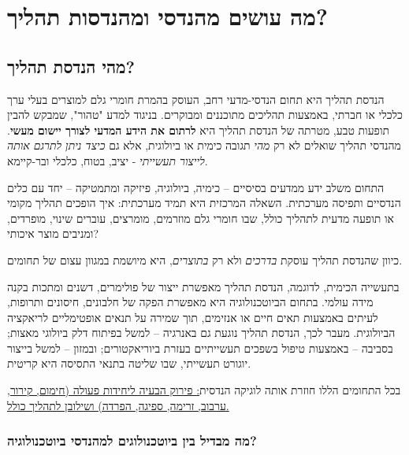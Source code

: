 \documentclass[
  hebrew,
  letterpaper,
  DIV=11,
  numbers=noendperiod]{scrreprt}
\begin{document}

\chapter{\texorpdfstring{{מה עושים מהנדסי ומהנדסות
תהליך?}}{מה עושים מהנדסי ומהנדסות תהליך?}}\label{ux5deux5d4-ux5e2ux5d5ux5e9ux5d9ux5dd-ux5deux5d4ux5e0ux5d3ux5e1ux5d9-ux5d5ux5deux5d4ux5e0ux5d3ux5e1ux5d5ux5ea-ux5eaux5d4ux5dcux5d9ux5da}

\section{\texorpdfstring{{מהי הנדסת
תהליך}?}{מהי הנדסת תהליך?}}\label{ux5deux5d4ux5d9-ux5d4ux5e0ux5d3ux5e1ux5ea-ux5eaux5d4ux5dcux5d9ux5da}

{הנדסת תהליך היא תחום הנדסי-מדעי רחב, העוסק בהמרת חומרי גלם למוצרים בעלי
ערך כלכלי או חברתי, באמצעות תהליכים מתוכננים ומבוקרים. בניגוד למדע
"טהור", שמבקש להבין תופעות טבע, מטרתה של הנדסת תהליך היא \textbf{לרתום
את הידע המדעי לצורך יישום מעשי}}. {מהנדסי תהליך שואלים לא רק \emph{מהי}
תגובה כימית או ביולוגית, אלא גם \emph{כיצד ניתן לתרגם אותה לייצור
תעשייתי} - יציב, בטוח, כלכלי ובר-קיימא}.

{התחום משלב ידע ממדעים בסיסיים -- כימיה, ביולוגיה, פיזיקה ומתמטיקה --
יחד עם כלים הנדסיים ותפיסה מערכתית. השאלה המרכזית היא תמיד מערכתית: איך
הופכים תהליך מקומי או תופעה מדעית לתהליך כולל, שבו חומרי גלם מוזרמים,
מומרצים, עוברים שינוי, מופרדים, ומניבים מוצר איכותי}?

{כיוון שהנדסת תהליך עוסקת \emph{בדרכים} ולא רק \emph{בתוצרים}}, {היא
מיושמת במגוון עצום של תחומים}.

{בתעשייה הכימית, לדוגמה, הנדסת תהליך מאפשרת ייצור של פולימרים, דשנים
ומתכות בקנה מידה עולמי. בתחום הביוטכנולוגיה היא מאפשרת הפקה של חלבונים,
חיסונים ותרופות, לעיתים באמצעות תאים חיים או אנזימים, תוך שמירה על תנאים
אופטימליים לריאקציה הביולוגית}. {מעבר לכך, הנדסת תהליך נוגעת גם באנרגיה
-- למשל בפיתוח דלק ביולוגי מאצות}; {בסביבה -- באמצעות טיפול בשפכים
תעשייתיים בעזרת ביוריאקטורים}; {ובמזון -- למשל בייצור יוגורט תעשייתי},
{שבו שליטה בתנאי התסיסה היא קריטית}.

{בכל התחומים הללו חוזרת אותה לוגיקה הנדסית\ul{: פירוק הבעיה ליחידות
פעולה (חימום, קירור, ערבוב, זרימה, ספיגה, הפרדה) ושילובן לתהליך
כולל}}\ul{.}

\subsection{\texorpdfstring{{מה מבדיל בין ביוטכנולוגים למהנדסי
ביוטכנולוגיה}?}{מה מבדיל בין ביוטכנולוגים למהנדסי ביוטכנולוגיה?}}\label{ux5deux5d4-ux5deux5d1ux5d3ux5d9ux5dc-ux5d1ux5d9ux5df-ux5d1ux5d9ux5d5ux5d8ux5dbux5e0ux5d5ux5dcux5d5ux5d2ux5d9ux5dd-ux5dcux5deux5d4ux5e0ux5d3ux5e1ux5d9-ux5d1ux5d9ux5d5ux5d8ux5dbux5e0ux5d5ux5dcux5d5ux5d2ux5d9ux5d4}
\end{document}
